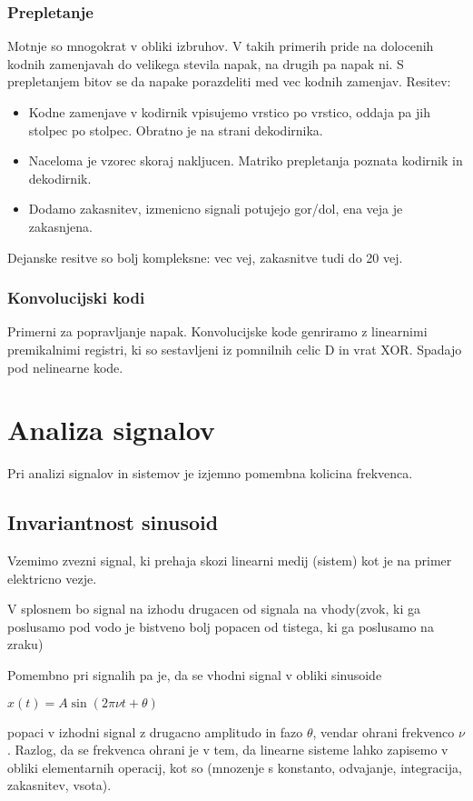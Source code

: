 \documentclass{article}
\begin{document}
\begin{multicols}{4}
\subsubsection{Prepletanje}
Motnje so mnogokrat v obliki izbruhov. V takih primerih pride na dolocenih kodnih zamenjavah do velikega stevila napak, na drugih pa napak ni.
S prepletanjem bitov se da napake porazdeliti med vec kodnih zamenjav.
Resitev:
\begin{itemize}
    \item Kodne zamenjave v kodirnik vpisujemo vrstico po vrstico, oddaja pa jih stolpec po stolpec. Obratno je na strani dekodirnika.
    \item Naceloma je vzorec skoraj nakljucen. Matriko prepletanja poznata kodirnik in dekodirnik.
    \item Dodamo zakasnitev, izmenicno signali potujejo gor/dol, ena veja je zakasnjena.
\end{itemize}
Dejanske resitve so bolj kompleksne: vec vej, zakasnitve tudi do 20 vej.

\subsubsection{Konvolucijski kodi}
Primerni za popravljanje napak. Konvolucijske kode genriramo z linearnimi premikalnimi registri, ki so sestavljeni iz 
pomnilnih celic D in vrat XOR. Spadajo pod nelinearne kode.

\section{Analiza signalov}
Pri analizi signalov in sistemov je izjemno pomembna kolicina frekvenca.

\subsection{Invariantnost sinusoid}
Vzemimo zvezni signal, ki prehaja skozi linearni medij (sistem) kot je na primer elektricno vezje.

V splosnem bo signal na izhodu drugacen od signala na vhody(zvok, ki ga poslusamo pod vodo je bistveno bolj popacen od tistega,
ki ga poslusamo na zraku)

Pomembno pri signalih pa je, da se vhodni signal v obliki sinusoide
\begin{center}
    \begin{math}
        x(t) = A \sin (2 \pi \nu t + \theta)
    \end{math}
\end{center}
popaci v izhodni signal z drugacno amplitudo in fazo $\theta$, vendar ohrani frekvenco $\nu$. Razlog, da se frekvenca
ohrani je v tem, da linearne sisteme lahko zapisemo v obliki elementarnih operacij, kot so (mnozenje s konstanto, odvajanje,
integracija, zakasnitev, vsota).


\end{multicols}
\end{document}
